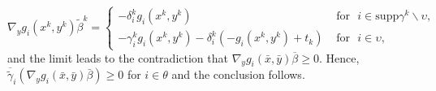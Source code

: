 	
	\begin{equation}
	\nabla_{y}g_{i}(x^{k},y^{k})\tilde{\beta}^{k}=\left\{
	\begin{array}{lll}
	
	-\delta _{i}^{k}g_{i}(x^{k},y^{k})& \mbox{ for }\,\, i\in\mathrm{supp}\gamma^{k}\backslash\upsilon,& \\
	-\gamma
	_{i}^{k}g_{i}(x^{k},y^{k})-\delta _{i}^{k}(-g_{i}(x^{k},y^{k})+t_{k})  & \mbox{ for }\,\,  i\in \upsilon,&
	\end{array}
	\right.
	\end{equation}
	and the limit leads to the contradiction that  $\nabla_{y}g_{i}(\bar{x},\bar{y})\overline{\beta}\geq0$. Hence, $\overline{\tilde{\gamma}}_{i}(\nabla_{y}g_{i}(\bar
	{x},\bar{y})\bar{\beta})\geq0$ for $i\in\theta$ and the conclusion
	follows.


